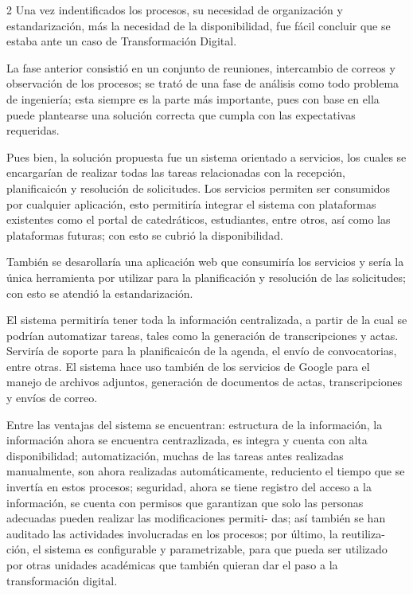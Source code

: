 \documentclass[12pt,spanish,Letterpaper,openany]{book}
\begin{document}
\begin {multicols}{2}
Una vez indentificados los procesos, su necesidad de organización y estandarización, más la necesidad de la disponibilidad, fue fácil concluir que se estaba ante un caso de Transformación Digital.

La fase anterior consistió en un conjunto de reuniones, intercambio de correos y observación de los procesos; se trató de una fase de análisis como todo problema de ingeniería; esta siempre es la parte más importante, pues con base en ella puede plantearse una solución correcta que cumpla con las expectativas requeridas.

Pues bien, la solución propuesta fue un sistema orientado a servicios, los cuales se encargarían de realizar todas las tareas relacionadas con la recepción, planificaicón y resolución de solicitudes. Los servicios permiten ser consumidos por cualquier aplicación, esto permitiría integrar el sistema con plataformas existentes como el portal de catedráticos, estudiantes, entre otros, así como las plataformas futuras; con esto se cubrió la disponibilidad.

También se desarollaría una aplicación web que consumiría los servicios y sería la única herramienta por utilizar para la planificación y resolución de las solicitudes; con esto se atendió la estandarización.

El sistema permitiría tener toda la información centralizada, a partir de la cual se podrían automatizar tareas, tales como la generación de transcripciones y actas. Serviría de soporte para la planificaicón de la agenda, el envío de convocatorias, entre otras.
El sistema hace uso también de los servicios de Google para el manejo de archivos adjuntos, generación de documentos de actas, transcripciones y envíos de correo.

Entre las ventajas del sistema se encuentran: estructura de la información, la información ahora se encuentra centrazlizada, es integra y cuenta con alta disponibilidad; automatización, muchas de las tareas antes realizadas manualmente, son ahora realizadas automáticamente, reduciento el tiempo que se invertía en estos procesos; seguridad, ahora se tiene registro del acceso a la información, se cuenta con permisos que garantizan que solo las personas adecuadas pueden realizar las modificaciones permiti-
das; así también se han auditado las actividades involucradas en los procesos; por último, la reutiliza-
ción, el sistema es configurable y parametrizable, para que pueda ser utilizado por otras unidades académicas que también quieran dar el paso a la transformación digital.


\end{multicols}
\end{document}
